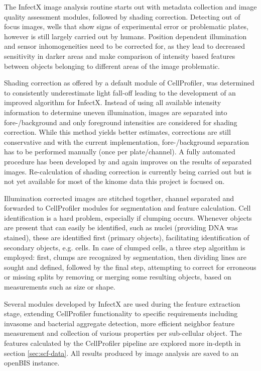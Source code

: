 The InfectX image analysis routine starts out with metadata collection and image quality assessment modules, followed by shading correction. Detecting out of focus images, wells that show signs of experimental error or problematic plates, however is still largely carried out by humans. Position dependent illumination and sensor inhomogeneities need to be corrected for, as they lead to decreased sensitivity in darker areas and make comparison of intensity based features between objects belonging to different areas of the image problematic.

Shading correction as offered by a default module of CellProfiler, was determined to consistently underestimate light fall-off leading to the development of an improved algorithm for InfectX. Instead of using all available intensity information to determine uneven illumination, images are separated into fore-/background and only foreground intensities are considered for shading correction. While this method yields better estimates, corrections are still conservative and with the current implementation, fore-/background separation has to be performed manually (once per plate/channel). A fully automated procedure has been developed by \cite{Smith2015} and again improves on the results of separated images. Re-calculation of shading correction is currently being carried out but is not yet available for most of the kinome data this project is focused on.

Illumination corrected images are stitched together, channel separated and forwarded to CellProfiler modules for segmentation and feature calculation. Cell identification is a hard problem, especially if clumping occurs. Whenever objects are present that can easily be identified, such as nuclei (providing DNA was stained), these are identified first (primary objects), facilitating identification of secondary objects, e.g. cells. In case of clumped cells, a three step algorithm is employed: first, clumps are recognized by segmentation, then dividing lines are sought and defined, followed by the final step, attempting to correct for erroneous or missing splits by removing or merging some resulting objects, based on measurements such as size or shape.

Several modules developed by InfectX are used during the feature extraction stage, extending CellProfiler functionality to specific requirements including invasome and bacterial aggregate detection, more efficient neighbor feature measurement and collection of various properties per sub-cellular object. The features calculated by the CellProfiler pipeline are explored more in-depth in section \ref{sec:scf-data}. All results produced by image analysis are saved to an openBIS instance.

